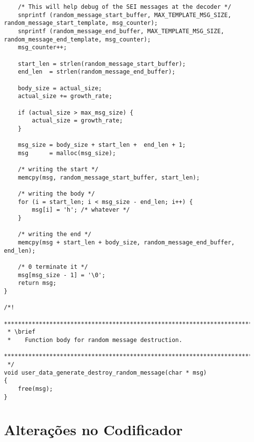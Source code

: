 \begin{lstlisting}
    /* This will help debug of the SEI messages at the decoder */
    snprintf (random_message_start_buffer, MAX_TEMPLATE_MSG_SIZE, random_message_start_template, msg_counter);
    snprintf (random_message_end_buffer, MAX_TEMPLATE_MSG_SIZE, random_message_end_template, msg_counter);
    msg_counter++;

    start_len = strlen(random_message_start_buffer);
    end_len  = strlen(random_message_end_buffer);

    body_size = actual_size;
    actual_size += growth_rate;

    if (actual_size > max_msg_size) {
        actual_size = growth_rate;
    }
    
    msg_size = body_size + start_len +  end_len + 1;
    msg      = malloc(msg_size);

    /* writing the start */
    memcpy(msg, random_message_start_buffer, start_len);
    
    /* writing the body */
    for (i = start_len; i < msg_size - end_len; i++) {
        msg[i] = 'h'; /* whatever */
    }

    /* writing the end */
    memcpy(msg + start_len + body_size, random_message_end_buffer, end_len);

    /* 0 terminate it */
    msg[msg_size - 1] = '\0';
    return msg;
}

/*!
 *************************************************************************************
 * \brief
 *    Function body for random message destruction.
 *************************************************************************************
 */
void user_data_generate_destroy_random_message(char * msg)
{
    free(msg);
}
\end{lstlisting}

\section{Alterações no Codificador}

